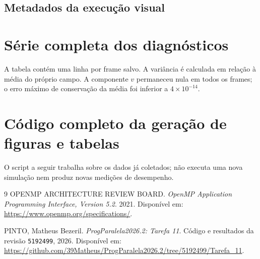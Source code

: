 \documentclass[12pt,a4paper]{article}
\begin{document}
\subsection{Metadados da execução visual}


\clearpage
\section{Série completa dos diagnósticos}
A tabela contém uma linha por frame salvo. A variância é calculada em relação à média do próprio campo. A componente $v$ permaneceu nula em todos os frames; o erro máximo de conservação da média foi inferior a $4\times10^{-14}$.


\clearpage
\section{Código completo da geração de figuras e tabelas}
O script a seguir trabalha sobre os dados já coletados; não executa uma nova simulação nem produz novas medições de desempenho.


\clearpage
\begin{thebibliography}{9}
OPENMP ARCHITECTURE REVIEW BOARD.
\textit{OpenMP Application Programming Interface, Version 5.2}.
2021. Disponível em:
\url{https://www.openmp.org/specifications/}.

PINTO, Matheus Bezeril.
\textit{ProgParalela2026.2: Tarefa 11}.
Código e resultados da revisão \texttt{5192499}, 2026.
Disponível em:
\url{https://github.com/39Matheus/ProgParalela2026.2/tree/5192499/Tarefa_11}.
\end{thebibliography}
\end{document}
